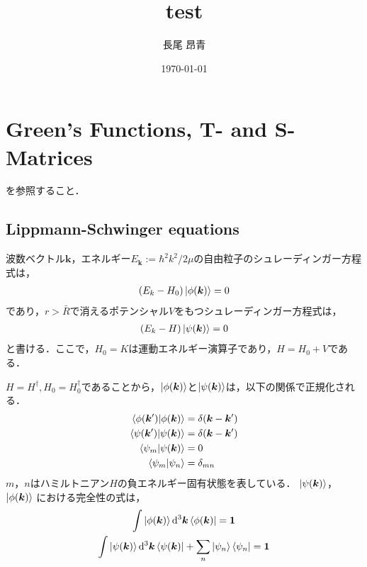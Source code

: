 \documentclass[a4paper,11pt]{ltjsarticle}
\numberwithin{equation}{section}
\begin{document}
\title{test}
\author{長尾 昂青}
\date{\today}
\maketitle

\tableofcontents

\newpage
\section{Green's Functions, T- and S-Matrices}

\cite{canto2013scattering}を参照すること．

\subsection{Lippmann-Schwinger equations}
波数ベクトル$\bm{k}$，エネルギー$E_{\bm{k}} := \hbar^2 k^2 / 2\mu$の自由粒子のシュレーディンガー方程式は，
\begin{align}\label{eq:free_p_shcrodinger}
  (E_k - H_0) \ket{\phi(\bm{k})} = 0
\end{align}
であり，$r>\bar{R}$で消えるポテンシャル$V$をもつシュレーディンガー方程式は，
\begin{align}\label{eq:int_p_schrodinger}
  (E_k - H)\ket{\psi(\bm{k})} = 0
\end{align}
と書ける．ここで，$H_0 = K$は運動エネルギー演算子であり，$H = H_0 + V$である．

$H = H^\dagger, H_0 = H_0^\dagger$であることから，$\ket{\phi(\bm{k})}$と$\ket{\psi(\bm{k})}$は，以下の関係で正規化される．
\begin{align}\label{eq:normalization_condition}
  \braket{\phi(\bm{k}')}{\phi(\bm{k})} &= \delta (\bm{k}- \bm{k}') \\
  \braket{\psi(\bm{k}')}{\psi(\bm{k})} &= \delta (\bm{k}-\bm{k}') \\
  \braket{\psi_m}{\psi(\bm{k})} &= 0 \\
  \braket{\psi_m}{\psi_n} &= \delta_{mn}
\end{align}
$m$，$n$はハミルトニアン$H$の負エネルギー固有状態を表している．
$\ket{\psi(\bm{k})}$，$\ket{\phi(\bm{k})}$
における完全性の式は，
\begin{gather}\label{eq:complete_set}
  \int \ket{\phi(\bm{k})} \dd[3]{\bm{k}} \bra{\phi(\bm{k})} = \bm{1} \\
  \int \ket{\psi(\bm{k})} \dd[3]{\bm{k}} \bra{\psi(\bm{k})} + \sum_n \ket{\psi_n} \bra{\psi_n} = \bm{1} 
\end{gather}
\end{document}
